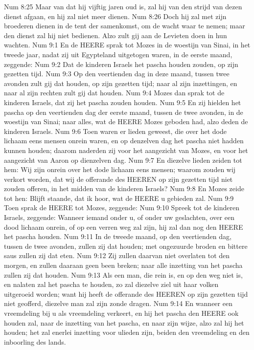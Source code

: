 Num 8:25  Maar van dat hij vijftig jaren oud is, zal hij van den strijd van dezen dienst afgaan, en hij zal niet meer dienen.
Num 8:26  Doch hij zal met zijn broederen dienen in de tent der samenkomst, om de wacht waar te nemen; maar den dienst zal hij niet bedienen. Alzo zult gij aan de Levieten doen in hun wachten.
Num 9:1  En de HEERE sprak tot Mozes in de woestijn van Sinai, in het tweede jaar, nadat zij uit Egypteland uitgetogen waren, in de eerste maand, zeggende:
Num 9:2  Dat de kinderen Israels het pascha houden zouden, op zijn gezetten tijd.
Num 9:3  Op den veertienden dag in deze maand, tussen twee avonden zult gij dat houden, op zijn gezetten tijd; naar al zijn inzettingen, en naar al zijn rechten zult gij dat houden.
Num 9:4  Mozes dan sprak tot de kinderen Israels, dat zij het pascha zouden houden.
Num 9:5  En zij hielden het pascha op den veertienden dag der eerste maand, tussen de twee avonden, in de woestijn van Sinai; naar alles, wat de HEERE Mozes geboden had, alzo deden de kinderen Israels.
Num 9:6  Toen waren er lieden geweest, die over het dode lichaam eens mensen onrein waren, en op denzelven dag het pascha niet hadden kunnen houden; daarom naderden zij voor het aangezicht van Mozes, en voor het aangezicht van Aaron op dienzelven dag.
Num 9:7  En diezelve lieden zeiden tot hem: Wij zijn onrein over het dode lichaam eens mensen; waarom zouden wij verkort worden, dat wij de offerande des HEEREN op zijn gezetten tijd niet zouden offeren, in het midden van de kinderen Israels?
Num 9:8  En Mozes zeide tot hen: Blijft staande, dat ik hoor, wat de HEERE u gebieden zal.
Num 9:9  Toen sprak de HEERE tot Mozes, zeggende:
Num 9:10  Spreek tot de kinderen Israels, zeggende: Wanneer iemand onder u, of onder uw geslachten, over een dood lichaam onrein, of op een verren weg zal zijn, hij zal dan nog den HEERE het pascha houden.
Num 9:11  In de tweede maand, op den veertienden dag, tussen de twee avonden, zullen zij dat houden; met ongezuurde broden en bittere saus zullen zij dat eten.
Num 9:12  Zij zullen daarvan niet overlaten tot den morgen, en zullen daaraan geen been breken; naar alle inzetting van het pascha zullen zij dat houden.
Num 9:13  Als een man, die rein is, en op den weg niet is, en nalaten zal het pascha te houden, zo zal diezelve ziel uit haar volken uitgeroeid worden; want hij heeft de offerande des HEEREN op zijn gezetten tijd niet geofferd, diezelve man zal zijn zonde dragen.
Num 9:14  En wanneer een vreemdeling bij u als vreemdeling verkeert, en hij het pascha den HEERE ook houden zal, naar de inzetting van het pascha, en naar zijn wijze, alzo zal hij het houden; het zal enerlei inzetting voor ulieden zijn, beiden den vreemdeling en den inboorling des lands.
